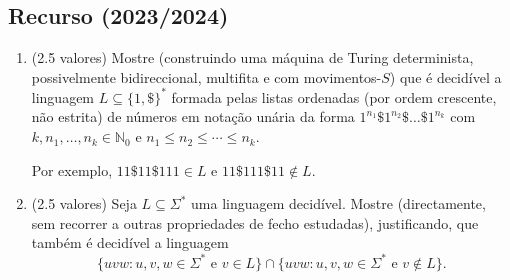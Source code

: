 \documentclass[a4paper,12pt]{article}
\begin{document}
\vspace{1.0cm}
\subsection*{Recurso (2023/2024)}
\begin{enumerate}[label=\alph*)]
  \item (2.5 valores) Mostre (construindo uma máquina de Turing determinista, possivelmente bidireccional, multifita e com movimentos-\(S\)) que é decidível a linguagem \(L \subseteq \{1, \$\}^*\) formada pelas listas ordenadas (por ordem crescente, não estrita) de números em notação unária da forma \(1^{n_1} \$ 1^{n_2} \$ \ldots \$ 1^{n_k}\) com \(k, n_1, \ldots, n_k \in \mathbb{N}_0\) e \(n_1 \leq n_2 \leq \cdots \leq n_k\).

  Por exemplo, \(11\$11\$111 \in L\) e \(11\$111\$11 \notin L\).

  \item (2.5 valores) Seja \(L \subseteq \Sigma^*\) uma linguagem decidível. Mostre (directamente, sem recorrer a outras propriedades de fecho estudadas), justificando, que também é decidível a linguagem
  \[\{uvw : u, v, w \in \Sigma^* \text{ e } v \in L\} \cap \{uvw : u, v, w \in \Sigma^* \text{ e } v \notin L\}.\]
\end{enumerate}
\end{document}
